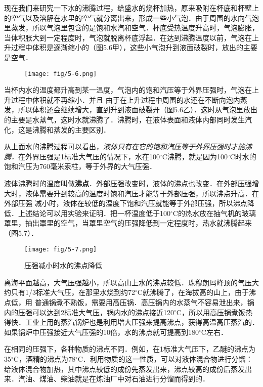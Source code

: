 现在我们来研究一下水的沸腾过程，给盛水的烧杯加热，原来吸附在杯底和杯壁上的空气以及溶解在水里的空气就分离出来，形成一些小气泡．由于周围的水向气泡里蒸发，所以气泡里包含的是饱和水汽和空气．杯底受热温度升高时，气泡膨胀，当体积胀大到一定程度时，气泡就脱离杯底浮起．在达到沸腾温度以前，气泡在上升过程中体积是逐渐缩小的（图5.6甲），这些小气泡升到液面破裂时，放出的主要是空气．
\begin{figure}[htp]
\centering
\texttt{[image: fig/5-6.png]}
\caption{}
\end{figure}

当杯内水的温度都升高到某一温度，气泡内的饱和汽压等于外界压强时，气泡在上升过程中体积就不再缩小．并且
由于在上升过程中周围的水还在不断向泡内蒸发，所以体积还会继续增大，直到升到液面破裂开（图5.6乙）．这时从气泡里放出的主要是水蒸气，这时水就沸腾了．沸腾时，在液体表面和液体内部同时发生汽化，这是沸腾和蒸发的主要区别．

从上面水的沸腾过程可以看出，\textit{液体只有在它的饱和汽压等于外界压强时才能沸腾．}在外界压强是1标准大气压的情况下，水在100$^\circ$C沸腾，就是因为100$^\circ$C时水的饱和汽压为760毫米汞柱，等于外界的大气压强．

液体沸腾时的温度叫做\textbf{沸点}．外部压强改变时，液体的沸点也改变．在外部压强增大时，液体需要升到较高的温度时饱和汽压才能等于外部压强，所以沸点升高．在外部压强
减小时，液体在较低的温度下饱和汽压就能等于外部压强，所以沸点降低．上述结论可以用实验来证明．把一杯温度低于100$^\circ$C的热水放在抽气机的玻璃罩里，抽出罩里的空气，当罩里空气的压强降低到一定程度时，热水就沸腾起来（图5.7）．
\begin{figure}[htp]
\centering
\texttt{[image: fig/5-7.png]}
\caption{压强减小时水的沸点降低}
\end{figure}

离海平面越高，大气压强越小，所以高山上水的沸点较低．珠穆朗玛峰顶的气压大约只有1/3标准大气压，在那里水烧到约72$^\circ$C就沸腾了，在海拔高的山上，由于沸点低，用
普通锅煮不熟饭，需要用高压锅．高压锅内的水蒸气不容易泄出来，锅内的压强可以达到2标准大气压，锅内水的沸点接近120$^\circ$C，所以用高压锅煮饭热得快．工业上用的蒸汽锅炉也是利用增大压强来提高沸点，获得高温高压蒸汽的．如果锅炉中压强接近大气压强的10倍，水的沸点就可提高到180$^\circ$C左右．

在相同的压强下，各种物质的沸点不同．例如，在1标准大气压下，乙醚的沸点为35$^\circ$C，酒精的沸点为78$^\circ$C．利用物质的这一性质，可以对液体混合物进行分馏：给液体混合物加热，其中沸点较低的成份先蒸发出来，沸点较高的成份后蒸发出来．汽油、煤油、柴油就是在炼油厂中对石油进行分馏而得到的．

